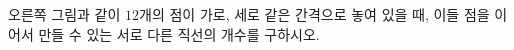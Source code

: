 \noindent\begin{minipage}[t]{0.6\linewidth}\vspace{0pt}\raggedright 오른쪽 그림과 같이 $12$개의 점이 가로, 세로 같은 간격으로 놓여 있을 때, 이들 점을 이어서 만들 수 있는 서로 다른 직선의 개수를 구하시오.\end{minipage}\hfill\begin{minipage}[t]{0.37\linewidth}\vspace{0pt}\end{minipage}
